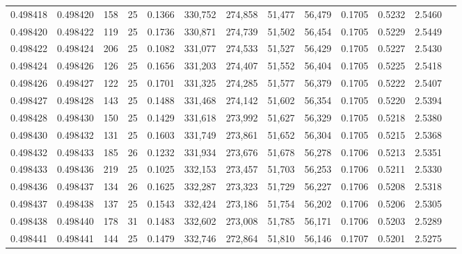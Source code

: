 \begin{tabular}{rrrrrrrrrrrrr}
0.498418 & 0.498420 & 158 &  25 &                                     0.1366 & 330,752 & 274,858 &  51,477 &  56,479 & 0.1705 & 0.5232 & 2.5460 \\
0.498420 & 0.498422 & 119 &  25 &                                     0.1736 & 330,871 & 274,739 &  51,502 &  56,454 & 0.1705 & 0.5229 & 2.5449 \\
0.498422 & 0.498424 & 206 &  25 &                                     0.1082 & 331,077 & 274,533 &  51,527 &  56,429 & 0.1705 & 0.5227 & 2.5430 \\
0.498424 & 0.498426 & 126 &  25 &                                     0.1656 & 331,203 & 274,407 &  51,552 &  56,404 & 0.1705 & 0.5225 & 2.5418 \\
0.498426 & 0.498427 & 122 &  25 &                                     0.1701 & 331,325 & 274,285 &  51,577 &  56,379 & 0.1705 & 0.5222 & 2.5407 \\
0.498427 & 0.498428 & 143 &  25 &                                     0.1488 & 331,468 & 274,142 &  51,602 &  56,354 & 0.1705 & 0.5220 & 2.5394 \\
0.498428 & 0.498430 & 150 &  25 &                                     0.1429 & 331,618 & 273,992 &  51,627 &  56,329 & 0.1705 & 0.5218 & 2.5380 \\
0.498430 & 0.498432 & 131 &  25 &                                     0.1603 & 331,749 & 273,861 &  51,652 &  56,304 & 0.1705 & 0.5215 & 2.5368 \\
0.498432 & 0.498433 & 185 &  26 &                                     0.1232 & 331,934 & 273,676 &  51,678 &  56,278 & 0.1706 & 0.5213 & 2.5351 \\
0.498433 & 0.498436 & 219 &  25 &                                     0.1025 & 332,153 & 273,457 &  51,703 &  56,253 & 0.1706 & 0.5211 & 2.5330 \\
0.498436 & 0.498437 & 134 &  26 &                                     0.1625 & 332,287 & 273,323 &  51,729 &  56,227 & 0.1706 & 0.5208 & 2.5318 \\
0.498437 & 0.498438 & 137 &  25 &                                     0.1543 & 332,424 & 273,186 &  51,754 &  56,202 & 0.1706 & 0.5206 & 2.5305 \\
0.498438 & 0.498440 & 178 &  31 &                                     0.1483 & 332,602 & 273,008 &  51,785 &  56,171 & 0.1706 & 0.5203 & 2.5289 \\
0.498441 & 0.498441 & 144 &  25 &                                     0.1479 & 332,746 & 272,864 &  51,810 &  56,146 & 0.1707 & 0.5201 & 2.5275 \\

\end{tabular}
